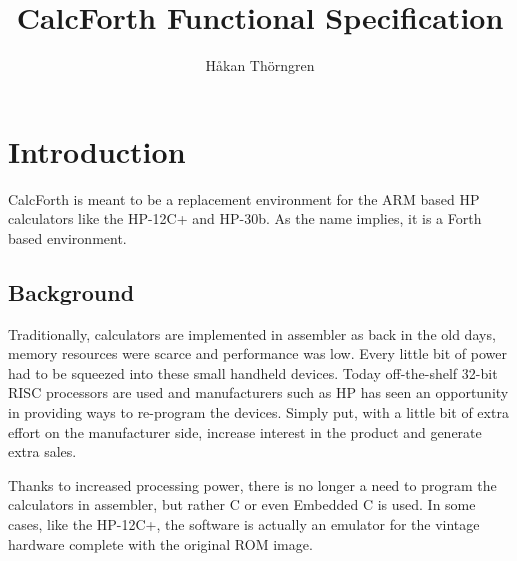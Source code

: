 \documentclass[a4paper]{article}
\begin{document}
\title{CalcForth Functional Specification}
\author{Håkan Thörngren}

 \newcommand{\CC}{C\nolinebreak\hspace{-.05em}\raisebox{.4ex}{\tiny\bf+}\nolinebreak\hspace{-.10em}\raisebox{.4ex}{\tiny\bf +}}

 \maketitle

\section{Introduction}
CalcForth is meant to be a replacement environment for the ARM based HP calculators like the HP-12C+ and HP-30b. As the name implies, it is a Forth based environment.

\subsection{Background}
Traditionally, calculators are implemented in assembler as back in the old days, memory resources were scarce and performance was low. Every little bit of power had to be squeezed into these small handheld devices. Today off-the-shelf 32-bit RISC processors are used and manufacturers such as HP has seen an opportunity in providing ways to re-program the devices. Simply put, with a little bit of extra effort on the manufacturer side, increase interest in the product and generate extra sales.

Thanks to increased processing power, there is no longer a need to program the calculators in assembler, but rather C or even Embedded \CC{} is used. In some cases, like the HP-12C+, the software is actually an emulator for the vintage hardware complete with the original ROM image.
\end{document}
